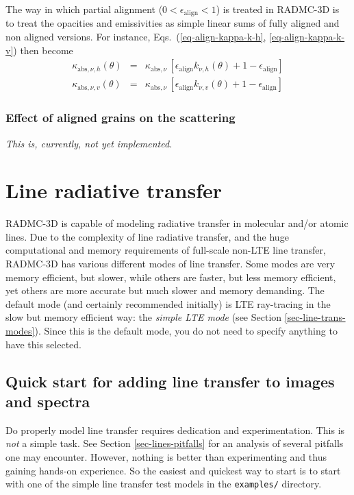 \documentclass{report}
\begin{document}
The way in which partial alignment ($0<\epsilon_{\mathrm{align}}<1$) is
treated in RADMC-3D is to treat the opacities and emissivities as simple
linear sums of fully aligned and non aligned versions. For instance,
Eqs.~(\ref{eq-align-kappa-k-h}, \ref{eq-align-kappa-k-v}) then become
\begin{eqnarray}
\kappa_{\mathrm{abs},\nu,h}(\theta) &=& \kappa_{\mathrm{abs},\nu}\,[\epsilon_{\mathrm{align}}k_{\nu,h}(\theta)+1-\epsilon_{\mathrm{align}}] \\
\kappa_{\mathrm{abs},\nu,v}(\theta) &=& \kappa_{\mathrm{abs},\nu}\,[\epsilon_{\mathrm{align}}k_{\nu,v}(\theta)+1-\epsilon_{\mathrm{align}}] 
\end{eqnarray}




\subsection{Effect of aligned grains on the scattering}
\label{sec-align-scat}
%
{\em This is, currently, not yet implemented.}





\chapter{Line radiative transfer}
\label{chap-line-transfer}
%
RADMC-3D is capable of modeling radiative transfer in molecular and/or
atomic lines. Due to the complexity of line radiative transfer, and the huge
computational and memory requirements of full-scale non-LTE line transfer,
RADMC-3D has various different modes of line transfer. Some modes are very
memory efficient, but slower, while others are faster, but less memory
efficient, yet others are more accurate but much slower and memory
demanding. The default mode (and certainly recommended initially) is LTE
ray-tracing in the slow but memory efficient way: the {\em simple LTE mode}
(see Section \ref{sec-line-trans-modes}). Since this is the default mode,
you do not need to specify anything to have this selected.


\section{Quick start for adding line transfer to images and spectra}
Do properly model line transfer requires dedication and experimentation.
This is {\em not} a simple task. See Section \ref{sec-lines-pitfalls} for an
analysis of several pitfalls one may encounter. However, nothing is better
than experimenting and thus gaining hands-on experience. So the easiest and
quickest way to start is to start with one of the simple line transfer test
models in the {\small\tt examples/} directory. 
\end{document}
